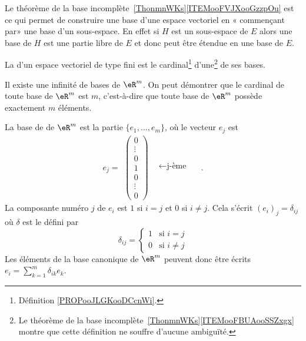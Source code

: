 \begin{remark}      \label{REMooYGJEooEcZQKa}
    Le théorème de la base incomplète~\ref{ThonmnWKs}\ref{ITEMooFVJXooGzzpOu} est ce qui permet de construire une base d'une espace vectoriel en « commençant par» une base d'un sous-espace. En effet si \( H\) est un sous-espace de \( E\) alors une base de \( H\) est une partie libre de \( E\) et donc peut être étendue en une base de \( E\).
\end{remark}

\begin{definition}      \label{DEFooWRLKooArTpgh}
    La  d'un espace vectoriel de type fini est le cardinal\footnote{Définition \ref{PROPooJLGKooDCcnWi}.} d'une\footnote{Le théorème de la base incomplète~\ref{ThonmnWKs}\ref{ITEMooFBUAooSSZxgx} montre que cette définition ne souffre d'aucune ambiguïté.} de ses bases.
\end{definition}

Il existe une infinité de bases de $\eR^m$. On peut démontrer que le cardinal de toute base de $\eR^m$ est $m$, c'est-à-dire que toute base de $\eR^m$ possède exactement $m$ éléments.

\begin{example}
    La base de  de \( \eR^m\) est la partie $\{e_1,\ldots, e_m\}$, où le vecteur $e_j$ est
    \begin{equation}\nonumber
      e_j=
    \begin{array}{cc}
      \begin{pmatrix}
        0\\\vdots\\0\\1\\ 0\\\vdots\\0
      \end{pmatrix} &
      \begin{matrix}
        \quad\\\quad\\\leftarrow\textrm{j-ème} \quad\\\quad\\\quad\\
      \end{matrix}
    \end{array}.
    \end{equation}
    La composante numéro $j$ de $e_i$ est $1$ si $i=j$ et $0$ si $i\neq j$. Cela s'écrit $(e_i)_j=\delta_{ij}$ où $\delta$ est le  défini par
    \begin{equation}
        \delta_{ij}=\begin{cases}
            1	&	\text{si }i=j\\
            0	&	 \text{si }i\neq j
        \end{cases}
    \end{equation}
    Les éléments de la base canonique de $\eR^m$ peuvent donc être écrits $e_i=\sum_{k=1}^m\delta_{ik}e_k$.
\end{example}

